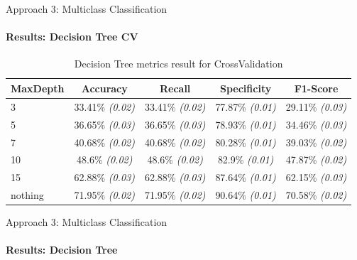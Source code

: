 \documentclass[9pt, pstricks, xcolor=dvipsnames]{beamer}
\begin{document}
\begin{frame}{Approach 3: Multiclass Classification}
\framesubtitle{Results: Decision Tree CV}
\begin{table}[H]
\centering
\begin{tabular}{lcccc}
\toprule
MaxDepth & Accuracy & Recall & Specificity & F1-Score \\
\midrule
3 & 33.41\% \textit{(0.02)} & 33.41\% \textit{(0.02)} & 77.87\% \textit{(0.01)} & 29.11\% \textit{(0.03)} \\
5 & 36.65\% \textit{(0.03)} & 36.65\% \textit{(0.03)} & 78.93\% \textit{(0.01)} & 34.46\% \textit{(0.03)} \\
7 & 40.68\% \textit{(0.02)} & 40.68\% \textit{(0.02)} & 80.28\% \textit{(0.01)} & 39.03\% \textit{(0.02)} \\
10 & 48.6\% \textit{(0.02)} & 48.6\% \textit{(0.02)} & 82.9\% \textit{(0.01)} & 47.87\% \textit{(0.02)} \\
15 & 62.88\% \textit{(0.03)} & 62.88\% \textit{(0.03)} & 87.64\% \textit{(0.01)} & 62.15\% \textit{(0.03)} \\
nothing & 71.95\% \textit{(0.02)} & 71.95\% \textit{(0.02)} & 90.64\% \textit{(0.01)} & 70.58\% \textit{(0.02)} \\
\bottomrule
\end{tabular}
\caption{Decision Tree metrics result for CrossValidation}
\label{tab:DT_CV_approach3}
\end{table}
\end{frame}
\begin{frame}{Approach 3: Multiclass Classification}
\framesubtitle{Results: Decision Tree}
\begin{table}[H]
\centering
{}
\caption{DecisionTree metrics result}
\label{tab:dt_approach3}
\end{table}
\end{frame}
\end{document}
